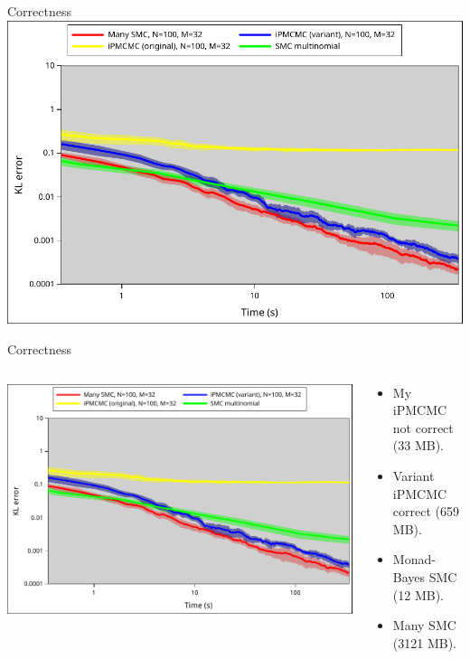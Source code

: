 \documentclass[usenames,dvipsnames,10pt]{beamer}
\begin{document}
\begin{frame}[fragile]{Correctness}
    \includegraphics[width=\textwidth]{correctness.pdf}
\end{frame}

\begin{frame}[fragile]{Correctness}
    \begin{columns}
        \begin{column}{0.5\textwidth}
    \includegraphics[width=\textwidth]{correctness.pdf}
        \end{column}
        \begin{column}{0.5\textwidth}
            \begin{itemize}
                \item My iPMCMC not correct (33 MB).
                \item Variant iPMCMC correct (659 MB).
                \item Monad-Bayes SMC (12 MB).
                \item Many SMC (3121 MB).
            \end{itemize} 
        \end{column}
    \end{columns}
\end{frame}
\end{document}
